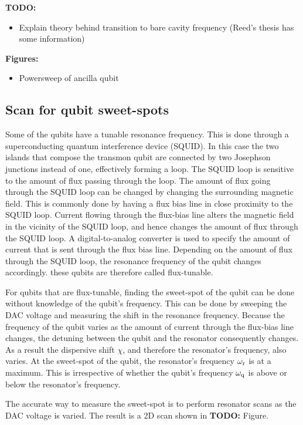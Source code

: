         \textbf{TODO:}
        \begin{itemize}
          \item Explain theory behind transition to bare cavity frequency (Reed's thesis has some information)
        \end{itemize}

        \textbf{Figures:}
        \begin{itemize}
          \item Powersweep of ancilla qubit
        \end{itemize}

      \subsection{Scan for qubit sweet-spots}
        Some of the qubits have a tunable resonance frequency. This is done through a superconducting quantum interference device (SQUID). In this case the two islands that compose the transmon qubit are connected by two Josephson junctions instead of one, effectively forming a loop. The SQUID loop is sensitive to the amount of flux passing through the loop. The amount of flux going through the SQUID loop can be changed by changing the surrounding magnetic field. This is commonly done by having a flux bias line in close proximity to the SQUID loop. Current flowing through the flux-bias line alters the magnetic field in the vicinity of the SQUID loop, and hence changes the amount of flux through the SQUID loop. A digital-to-analog converter is used to specify the amount of current that is sent through the flux bias line. Depending on the amount of flux through the SQUID loop, the resonance frequency of the qubit changes accordingly. these qubits are therefore called flux-tunable.

        For qubits that are flux-tunable, finding the sweet-spot of the qubit can be done without knowledge of the qubit's frequency. This can be done by sweeping the DAC voltage and measuring the shift in the resonance frequency. Because the frequency of the qubit varies as the amount of current through the flux-bias line changes, the detuning between the qubit and the resonator consequently changes. As a result the dispersive shift $\chi$, and therefore the resonator's frequency, also varies. At the sweet-spot of the qubit, the resonator's frequency $\omega_\text{r}$ is at a maximum. This is irrespective of whether the qubit's frequency $\omega_\text{q}$ is above or below the resonator's frequency.

        The accurate way to measure the sweet-spot is to perform resonator scans as the DAC voltage is varied. The result is a 2D scan shown in \textbf{TODO:} Figure.

